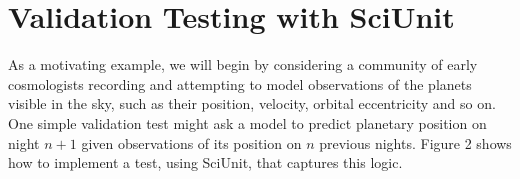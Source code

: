 \documentclass[9pt]{sig-alternate}
\begin{document}





\section{Validation Testing with {SciUnit}}

As a motivating example, we will begin by considering a community of early cosmologists recording and attempting to model observations of the planets visible in the sky, such as their position, velocity, orbital eccentricity and so on. One simple validation test might ask a model to predict planetary position on night $n+1$ given observations of its position on $n$ previous nights. Figure 2 shows how to implement a test, using  SciUnit, that captures this logic.
\end{document}
